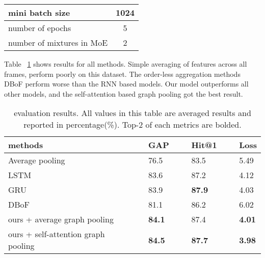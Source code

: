 \documentclass[runningheads]{llncs}
\begin{document}
\begin{table}[]
\begin{center}
{\begin{tabular}{lcllll}
mini batch size & \multicolumn{5}{c}{1024} \\ \hline  
number of epochs &     \multicolumn{5}{c}{5} \\ \hline
number of mixtures in MoE  &   \multicolumn{5}{c}{2}                                                                                                                                                                                                                                                                                                                                                                                                                                                                                                         \\ \hline
\end{tabular}}
\end{center}
\end{table}


Table ~\ref{table:trainresults} shows results for all methods. Simple averaging of features across all frames, perform poorly on this dataset. The  order-less aggregation methods DBoF perform worse than the RNN based models. Our model outperforms all other models, and the self-attention based graph pooling got the best result.
\begin{table}[]
\begin{center}
\caption{evaluation results. All values in this table are averaged results and reported in percentage(\%). Top-2 of each metrics are bolded.}
\label{table:trainresults}
    \begin{tabular}{llll}
    \hline
    methods~~~                               & GAP~~~   & Hit@1~~~   & Loss     \\ \hline
    Average pooling~~~                   & 76.5~~~    & 83.5~~~           & 5.49    \\ \hline
    LSTM ~~~                                 & 83.6~~~   & 87.2~~~           & 4.12 \\ \hline
    GRU ~~~                                  & 83.9~~~    & {\bf87.9} ~~~          & 4.03    \\ \hline
    DBoF  ~~~                                & 81.1~~~   & 86.2~~~           & 6.02 \\ \hline
    ours + average graph pooling~~~          & {\bf84.1} ~~~  & 87.4         & {\bf4.01}   \\ \hline
    ours + self-attention graph pooling~~~   & {\bf84.5} & {\bf87.7}~~~       & {\bf3.98}      \\
    \end{tabular}
    \end{center}
\end{table}
\end{document}
